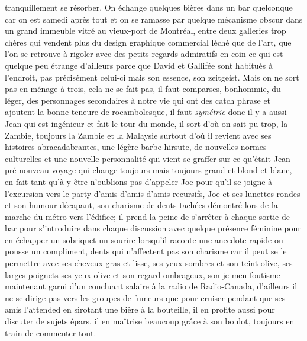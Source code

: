 tranquillement  se résorber. On échange quelques bières dans un bar quelconque
car on est samedi après tout et on se ramasse par quelque mécanisme obscur dans
un grand immeuble vitré au vieux-port de Montréal, entre deux galleries trop
chères qui vendent plus du design graphique commercial léché que de l'art, que
l'on se retrouve à rigoler avec des petits regards admiratifs en coin ce qui
est quelque peu étrange d'ailleurs parce que David et Gallifée sont habitués à
l'endroit, pas précisément celui-ci mais son essence, son zeitgeist. Mais on ne
sort pas en ménage à trois, cela ne se fait pas, il faut comparses, bonhommie,
du léger, des personnages secondaires
à notre vie qui ont des catch phrase et ajoutent la bonne teneure de 
rocambolesque, il faut \emph{symétrie} donc il y a aussi Jean qui est ingénieur et
fait le tour du monde, il sort d'où on sait pu trop, la Zambie, toujours la
Zambie et la Malaysie surtout d'où il revient avec ses histoires
abracadabrantes, une légère barbe hirsute, de nouvelles normes culturelles et
une nouvelle personnalité qui vient se graffer sur ce qu'était Jean pré-nouveau
voyage qui change toujours mais toujours grand et blond et blanc, en fait tant
qu'à y être n'oublions pas d'appeler Joe pour qu'il se joigne à l'excursion vers
le party d'amis d'amis d'amis recursifs, Joe et  ses lunettes rondes et son humour
décapant, son charisme de dents tachées démontré lors de la marche du métro
vers l'édifice; il prend la peine de s'arrêter à chaque sortie de bar
pour s'introduire dans chaque discussion avec quelque présence féminine pour
en échapper un sobriquet un sourire lorsqu'il raconte une anecdote rapide
ou pousse un compliment, dents qui n'affectent pas son charisme
car il peut se le permettre avec ses cheveux gras et lisse, ses yeux sombres et
son teint olive, ses larges poignets ses yeux olive et son regard ombrageux,
son je-men-foutisme maintenant garni d'un concluant salaire à la radio de
Radio-Canada, d'ailleurs il ne se dirige pas vers les groupes de fumeurs
que pour cruiser pendant que ses amis l'attended en sirotant une bière à
la bouteille, il en profite aussi pour discuter de sujets épars, il en maîtrise
beaucoup grâce à son boulot, toujours en train de commenter tout.\\

